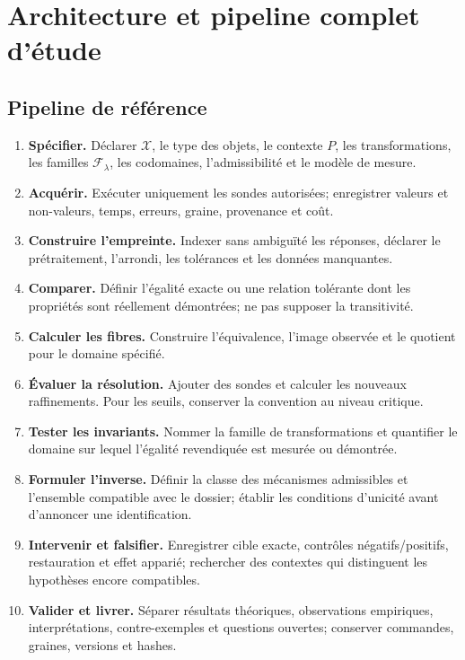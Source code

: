 \documentclass[11pt,a4paper,oneside]{report}
\newcommand{\X}{\mathcal X}
\newcommand{\Fcal}{\mathcal F}
\begin{document}
\chapter{Architecture et pipeline complet d'étude}
\section{Pipeline de référence}
\begin{enumerate}
\item \textbf{Spécifier.} Déclarer \(\X\), le type des objets, le contexte \(P\), les transformations, les familles \(\Fcal_\lambda\), les codomaines, l'admissibilité et le modèle de mesure.
\item \textbf{Acquérir.} Exécuter uniquement les sondes autorisées; enregistrer valeurs et non-valeurs, temps, erreurs, graine, provenance et coût.
\item \textbf{Construire l'empreinte.} Indexer sans ambiguïté les réponses, déclarer le prétraitement, l'arrondi, les tolérances et les données manquantes.
\item \textbf{Comparer.} Définir l'égalité exacte ou une relation tolérante dont les propriétés sont réellement démontrées; ne pas supposer la transitivité.
\item \textbf{Calculer les fibres.} Construire l'équivalence, l'image observée et le quotient pour le domaine spécifié.
\item \textbf{Évaluer la résolution.} Ajouter des sondes et calculer les nouveaux raffinements. Pour les seuils, conserver la convention au niveau critique.
\item \textbf{Tester les invariants.} Nommer la famille de transformations et quantifier le domaine sur lequel l'égalité revendiquée est mesurée ou démontrée.
\item \textbf{Formuler l'inverse.} Définir la classe des mécanismes admissibles et l'ensemble compatible avec le dossier; établir les conditions d'unicité avant d'annoncer une identification.
\item \textbf{Intervenir et falsifier.} Enregistrer cible exacte, contrôles négatifs/positifs, restauration et effet apparié; rechercher des contextes qui distinguent les hypothèses encore compatibles.
\item \textbf{Valider et livrer.} Séparer résultats théoriques, observations empiriques, interprétations, contre-exemples et questions ouvertes; conserver commandes, graines, versions et hashes.
\end{enumerate}
\end{document}
